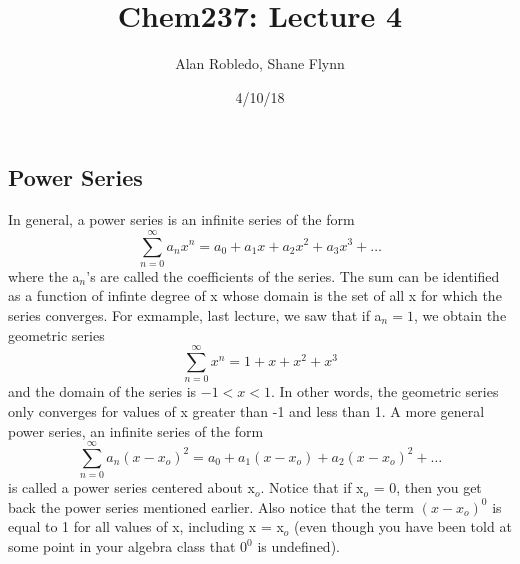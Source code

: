 \documentclass{article}
\title{Chem237: Lecture 4}
\date{4/10/18}
\author{Alan Robledo, Shane Flynn}
\newcommand{\be}{\begin{equation}}
\newcommand{\ee}{\end{equation}}
\newcommand{\sumzero}{\sum_{n=0}^\infty}
\begin{document}
\maketitle

\subsection*{Power Series}
In general, a power series is an infinite series of the form
\be
\sumzero a_n x^n = a_0 + a_1 x + a_2 x^2 + a_3 x^3 + \hdots
\ee
where the a$_n$'s are called the coefficients of the series.
The sum can be identified as a function of infinte degree of x whose domain is the set of all x for which the series converges.
For exmample, last lecture, we saw that if a$_n = 1$, we obtain the geometric series
\be
\sumzero x^n = 1 + x + x^2 + x^3
\ee
and the domain of the series is $-1 < x < 1$.
In other words, the geometric series only converges for values of x greater than -1 and less than 1.
A more general power series, an infinite series of the form
\be
\sumzero a_n (x - x_o)^2 = a_0 + a_1 (x - x_o) + a_2 (x - x_o)^2 + \hdots
\ee
is called a power series centered about x$_o$.
Notice that if x$_o$ = 0, then you get back the power series mentioned earlier.
Also notice that the term $(x - x_o)^0$ is equal to 1 for all values of x, including x = x$_o$ (even though you have been told at some point in your algebra class that $0^0$ is undefined).
\end{document}

